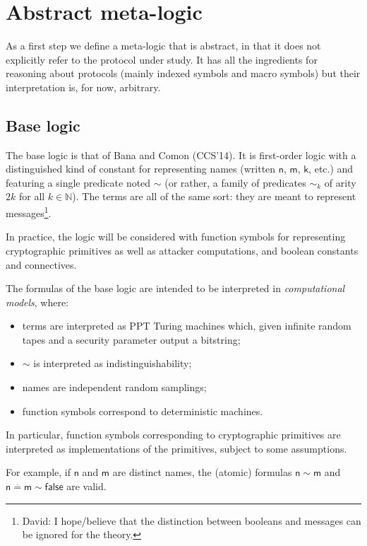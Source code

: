 \section{Abstract meta-logic}

As a first step we define a meta-logic that is abstract, in that it does
not explicitly refer to the protocol under study. It has all the ingredients
for reasoning about protocols (mainly indexed symbols and macro symbols)
but their interpretation is, for now, arbitrary.

\subsection{Base logic}

The base logic is that of Bana and Comon (CCS'14). It is first-order logic
with a distinguished kind of constant for representing names (written
$\mathsf{n}$, $\mathsf{m}$, $\mathsf{k}$, etc.)
and featuring a single predicate noted $\sim$ (or rather, a family
of predicates $\sim_k$ of arity $2 k$ for all $k\in\mathbb{N}$).
The terms are all of the same sort: they are meant to represent 
messages\footnote{
  David: I hope/believe that the distinction between booleans and messages
  can be ignored for the theory.
}.

In practice, the logic will be considered with function symbols for 
representing cryptographic primitives as well as attacker computations, and 
boolean constants and connectives.

The formulas of the base logic are intended to be interpreted in 
\emph{computational models}, where:
\begin{itemize}
  \item terms are interpreted as PPT Turing machines which,
    given infinite random tapes and a security parameter output a bitstring;
  \item $\sim$ is interpreted as indistinguishability;
  \item names are independent random samplings;
  \item function symbols correspond to deterministic machines.
\end{itemize}

In particular, function symbols corresponding to cryptographic primitives
are interpreted as implementations of the primitives, subject to some
assumptions.

For example, if $\mathsf{n}$ and $\mathsf{m}$ are distinct names,
the (atomic) formulas $\mathsf{n}\sim\mathsf{m}$ and 
$\mathsf{n}\stackrel{.}{=}\mathsf{m}\sim\mathsf{false}$
are valid.

